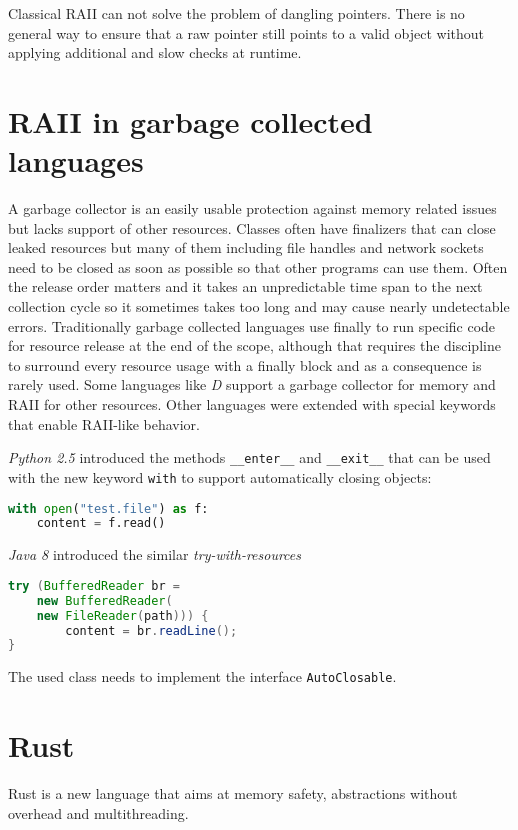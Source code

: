 \documentclass[conference,twocolumn]{IEEEtran}
\begin{document}
Classical RAII can not solve the problem of dangling pointers. There is no general way to ensure that a raw pointer still points to a valid object without applying additional and slow checks at runtime.






\section{RAII in garbage collected languages}
A garbage collector is an easily usable protection against memory related issues but lacks support of other resources. Classes often have finalizers that can close leaked resources but many of them including file handles and network sockets need to be closed as soon as possible so that other programs can use them. Often the release order matters and it takes an unpredictable time span to the next collection cycle so it sometimes takes too long and may cause nearly undetectable errors.
Traditionally garbage collected languages use finally to run specific code for resource release at the end of the scope, although that requires the discipline to surround every resource usage with a finally block and as a consequence is rarely used.
Some languages like \emph{D} support a garbage collector for memory and RAII for other resources. Other languages were extended with special keywords that enable RAII-like behavior.

\vline

\emph{Python 2.5} introduced the methods \verb|__enter__| and \verb|__exit__| that can be used with the new keyword \verb|with| to support automatically closing objects:
\begin{lstlisting}[language=python]
with open("test.file") as f:
    content = f.read()
\end{lstlisting}

\vline

\emph{Java 8} introduced the similar \emph{try-with-resources}
\begin{lstlisting}[language=java]
try (BufferedReader br =
    new BufferedReader(
    new FileReader(path))) {
        content = br.readLine();
}
\end{lstlisting}
The used class needs to implement the interface \verb|AutoClosable|.


\pagebreak

\section{Rust}
Rust is a new language that aims at memory safety, abstractions without overhead and multithreading.
\end{document}
